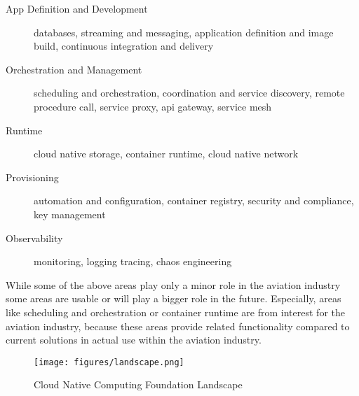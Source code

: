 \documentclass[titlepage]{report}
\begin{document}
\begin{description}
    \item[App Definition and Development] databases, streaming and messaging, application definition and image build, continuous integration and delivery
    \item[Orchestration and Management] scheduling and orchestration, coordination and service discovery, remote procedure call, service proxy, api gateway, service mesh
    \item[Runtime] cloud native storage, container runtime, cloud native network
    \item[Provisioning] automation and configuration, container registry, security and compliance, key management
    \item[Observability] monitoring, logging tracing, chaos engineering
\end{description}

While some of the above areas play only a minor role in the aviation industry some areas are usable or will play a bigger role in the future.
Especially, areas like scheduling and orchestration or container runtime are from interest for the aviation industry, because
these areas provide related functionality compared to current solutions in actual use within the aviation industry.

\begin{figure}[H]
    \centering
    \texttt{[image: figures/landscape.png]}
    \caption{Cloud Native Computing Foundation Landscape}\label{fig:landscape}
\end{figure}
 
\end{document}
